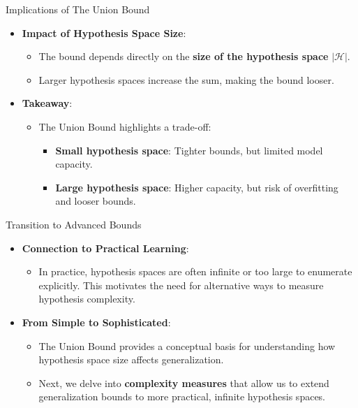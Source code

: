\documentclass[
  ignorenonframetext,
]{beamer}
\providecommand{\tightlist}{%
  \setlength{\itemsep}{0pt}\setlength{\parskip}{0pt}}\usepackage{longtable,booktabs,array}
\begin{document}
\begin{frame}{Implications of The Union Bound}
\label{implications-of-the-union-bound}
\begin{itemize}
\tightlist
\item
  \textbf{Impact of Hypothesis Space Size}:

  \begin{itemize}
  \tightlist
  \item
    The bound depends directly on the \textbf{size of the hypothesis
    space} \(|\mathcal{H}|\).
  \item
    Larger hypothesis spaces increase the sum, making the bound looser.
  \end{itemize}
\item
  \textbf{Takeaway}:

  \begin{itemize}
  \tightlist
  \item
    The Union Bound highlights a trade-off:

    \begin{itemize}
    \tightlist
    \item
      \textbf{Small hypothesis space}: Tighter bounds, but limited model
      capacity.
    \item
      \textbf{Large hypothesis space}: Higher capacity, but risk of
      overfitting and looser bounds.
    \end{itemize}
  \end{itemize}
\end{itemize}
\end{frame}

\begin{frame}{Transition to Advanced Bounds}
\label{transition-to-advanced-bounds}
\begin{itemize}
\tightlist
\item
  \textbf{Connection to Practical Learning}:

  \begin{itemize}
  \tightlist
  \item
    In practice, hypothesis spaces are often infinite or too large to
    enumerate explicitly. This motivates the need for alternative ways
    to measure hypothesis complexity.
  \end{itemize}
\item
  \textbf{From Simple to Sophisticated}:

  \begin{itemize}
  \tightlist
  \item
    The Union Bound provides a conceptual basis for understanding how
    hypothesis space size affects generalization.
  \item
    Next, we delve into \textbf{complexity measures} that allow us to
    extend generalization bounds to more practical, infinite hypothesis
    spaces.
  \end{itemize}
\end{itemize}
\end{frame}
\end{document}
